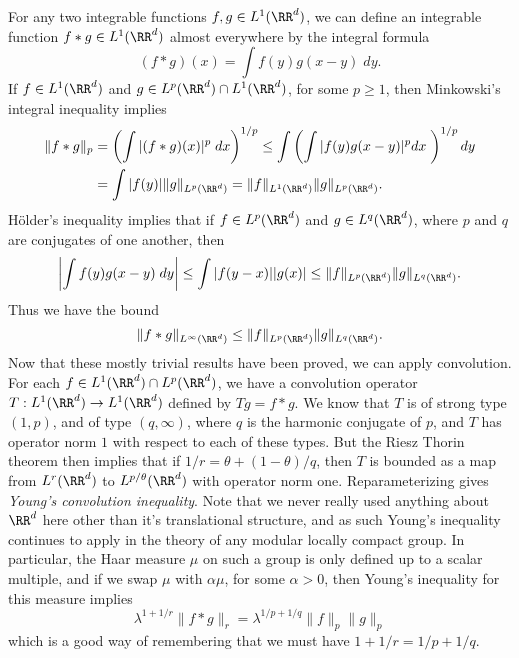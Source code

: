 \begin{example}
  For any two integrable functions $f,g \in L^1(\RR^d)$, we can define an integrable function $f * g \in L^1(\RR^d)$ almost everywhere by the integral formula
  \[ (f * g)(x) = \int f(y) g(x-y)\; dy. \]
  If $f \in L^1(\RR^d)$ and $g \in L^p(\RR^d) \cap L^1(\RR^d)$, for some $p \geq 1$, then Minkowski's integral inequality implies
  \begin{align*}
      \| f * g \|_p &= \left( \int |(f * g)(x)|^p\; dx \right)^{1/p} \leq \int \left( \int |f(y)g(x-y)|^p dx\; \right)^{1/p} dy\\
      &= \int |f(y)| \| g \|_{L^p(\RR^d)} = \| f \|_{L^1(\RR^d)} \| g \|_{L^p(\RR^d)}.
  \end{align*}
  H\"{o}lder's inequality implies that if $f \in L^p(\RR^d)$ and $g \in L^q(\RR^d)$, where $p$ and $q$ are conjugates of one another, then
  \begin{align*}
    \left| \int f(y) g(x-y)\; dy \right| \leq \int |f(y-x)| |g(x)| \leq \| f \|_{L^p(\RR^d)} \| g \|_{L^q(\RR^d)}.
  \end{align*}
    Thus we have the bound
    \[ \| f * g \|_{L^\infty(\RR^d)} \leq \| f \|_{L^p(\RR^d)} \| g \|_{L^q(\RR^d)}. \]
    Now that these mostly trivial results have been proved, we can apply convolution. For each $f \in L^1(\RR^d) \cap L^p(\RR^d)$, we have a convolution operator $T: L^1(\RR^d) \to L^1(\RR^d)$ defined by $Tg = f * g$. We know that $T$ is of strong type $(1,p)$, and of type $(q,\infty)$, where $q$ is the harmonic conjugate of $p$, and $T$ has operator norm $1$ with respect to each of these types. But the Riesz Thorin theorem then implies that if $1/r = \theta + (1 - \theta)/q$, then $T$ is bounded as a map from $L^r(\RR^d)$ to $L^{p/\theta}(\RR^d)$ with operator norm one. Reparameterizing gives \emph{Young's convolution inequality}. Note that we never really used anything about $\RR^d$ here other than it's translational structure, and as such Young's inequality continues to apply in the theory of any modular locally compact group. In particular, the Haar measure $\mu$ on such a group is only defined up to a scalar multiple, and if we swap $\mu$ with $\alpha \mu$, for some $\alpha > 0$, then Young's inequality for this measure implies
    \[ \lambda^{1 + 1/r} \| f * g \|_r = \lambda^{1/p + 1/q} \| f \|_p \| g \|_p \]
    which is a good way of remembering that we must have $1 + 1/r = 1/p + 1/q$. 
\end{example}

